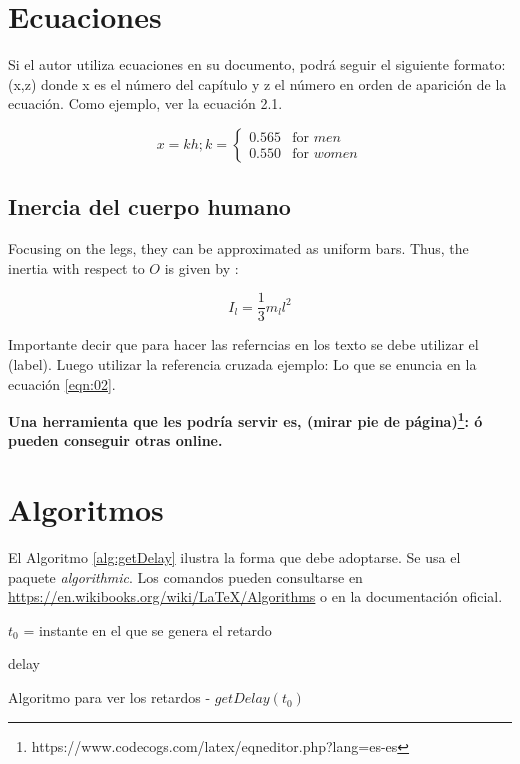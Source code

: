 \section{Ecuaciones}
Si el autor utiliza ecuaciones en su documento, podrá seguir el siguiente formato: (x,z) donde x es el número del capítulo y z el número en orden de aparición de la ecuación. Como ejemplo, ver la ecuación 2.1.

\begin{equation}
\label{eqn:01}
x=kh; k = 
\begin{cases} 
0.565  & \mbox{for } men   \\
0.550  & \mbox{for } women
\end{cases}
\end{equation}

\subsection{Inercia del cuerpo humano}

Focusing on the legs, they can be approximated as uniform bars. Thus, the inertia with respect to $O$ is given by \cite{ref:young2006sears}:

\begin{equation}
\label{eqn:02}
I_l = \frac{1}{3}m_ll^2
\end{equation}

Importante decir que para hacer las referncias en los texto se debe utilizar el (label). Luego utilizar la referencia cruzada ejemplo: Lo que se enuncia en la ecuación \ref{eqn:02}.

\textbf{Una herramienta que les podría servir es, (mirar pie de página)\footnote{https://www.codecogs.com/latex/eqneditor.php?lang=es-es}:  \'o pueden conseguir otras online. }

\section{Algoritmos}
El Algoritmo \ref{alg:getDelay} ilustra la forma que debe adoptarse. Se usa el paquete \textit{algorithmic}. Los comandos pueden consultarse en \url{https://en.wikibooks.org/wiki/LaTeX/Algorithms} o en la documentación oficial.

\begin{algorithm}[!htbp]
	\begin{algorithmic}
	\REQUIRE $t_0$ = instante en el que se genera el retardo
	
		\ELSE
			\ELSE
			\ENDIF
		\ENDIF
	\ELSE
	\ENDIF
	
	\RETURN delay
	\end{algorithmic}
	\caption{Algoritmo para ver los retardos - $getDelay(t_0)$}
	\label{alg:getDelay}
\end{algorithm}


